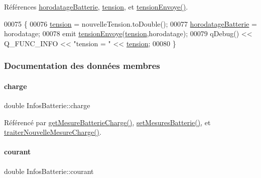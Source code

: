 Références \hyperlink{class_infos_batterie_a261067aff87023bccd60e59961ef1ffc}{horodatage\+Batterie}, \hyperlink{class_infos_batterie_a45d09805075337f7f2d4b84d02a2ee47}{tension}, et \hyperlink{class_infos_batterie_a932a48aafb94e5289d775bb3305fdb74}{tension\+Envoye()}.


\begin{DoxyCode}
00075 \{
00076     \hyperlink{class_infos_batterie_a45d09805075337f7f2d4b84d02a2ee47}{tension} = nouvelleTension.toDouble();
00077     \hyperlink{class_infos_batterie_a261067aff87023bccd60e59961ef1ffc}{horodatageBatterie} = horodatage;
00078     emit \hyperlink{class_infos_batterie_a932a48aafb94e5289d775bb3305fdb74}{tensionEnvoye}(\hyperlink{class_infos_batterie_a45d09805075337f7f2d4b84d02a2ee47}{tension},horodatage);
00079     qDebug() << Q\_FUNC\_INFO << \textcolor{stringliteral}{"tension = "} << \hyperlink{class_infos_batterie_a45d09805075337f7f2d4b84d02a2ee47}{tension};
00080 \}
\end{DoxyCode}


\subsubsection{Documentation des données membres}
\mbox{\label{class_infos_batterie_af3ad72cdbbf13f2dec6d81f078a2c0d2}} 
\paragraph{\texorpdfstring{charge}{charge}}
{\footnotesize\ttfamily double Infos\+Batterie\+::charge\hspace{0.3cm}{\ttfamily [private]}}



Référencé par \hyperlink{class_infos_batterie_a8c37174d0d36e4f5ada9d16dd5894803}{get\+Mesure\+Batterie\+Charge()}, \hyperlink{class_infos_batterie_ab1b2945b7d7c1a6207e29369690a27b9}{set\+Mesures\+Batterie()}, et \hyperlink{class_infos_batterie_a92c1afb1e022fe75cd7a0877d64e8d53}{traiter\+Nouvelle\+Mesure\+Charge()}.

\mbox{\label{class_infos_batterie_a417f025b2ccddea7d28f80df4413945a}} 
\paragraph{\texorpdfstring{courant}{courant}}
{\footnotesize\ttfamily double Infos\+Batterie\+::courant\hspace{0.3cm}{\ttfamily [private]}}



